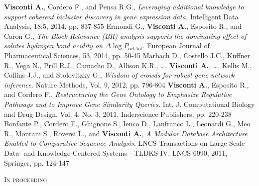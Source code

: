 \documentclass[a4paper,10pt]{article}
\newcommand{\smalltitle}[1]{
	\vspace{0.1cm}
	{\noindent 
	\large \textsc{#1}}
	\vspace{0.1cm}
}
\begin{document}
{\begin{itemize}
		\textbf{Visconti A.}, Cordero F., and Pensa R.G., \emph{Leveraging additional knowledge to support coherent bicluster discovery in gene expression data.} Intelligent Data Analysis, 18:5, 2014, pp. 837-855
		Ermondi G., \textbf{Visconti A.}, Esposito R., and Caron G., \emph{The Block Relevance (BR) analysis supports the dominating effect of solutes hydrogen bond acidity on $\Delta \log P_{\text{oct-tol}}$.} European Journal of Pharmaceutical Sciences, 53, 2014, pp. 50-45
		 Marbach D., Costello J.C., K\"{u}ffner R., Vega N., Prill R.J., Camacho D., Allison K.R., \dots, \textbf{Visconti A.}, \dots, Kellis M., Collins J.J., and Stolovitzky G., \emph{Wisdom of crowds for robust gene network inference.} Nature Methods, Vol. 9, 2012, pp. 796-804		
		 \textbf{Visconti A.}, Esposito R., and Cordero F., \emph{Restructuring the Gene Ontology to Emphasize Regulative Pathways and to Improve Gene Similarity Queries.} Int. J. Computational Biology and Drug Design, Vol. 4, No. 3, 2011, Inderscience Publishers, pp. 220-238
		 Bonfante P., Cordero F., Ghignone S., Ienco D., Lanfranco L., Leonardi G., Meo R., Montani S., Roversi L., and \textbf{Visconti A.}, \emph{A Modular Database Architecture Enabled to Comparative Sequence Analysis.} LNCS Transactions on Large-Scale Data- and Knowledge-Centered Systems - TLDKS IV, LNCS 6990, 2011, Springer, pp. 124-147 
	\end{itemize}
}

\vspace{0.4cm}
\newpage

\smalltitle{In proceeding}
\end{document}
